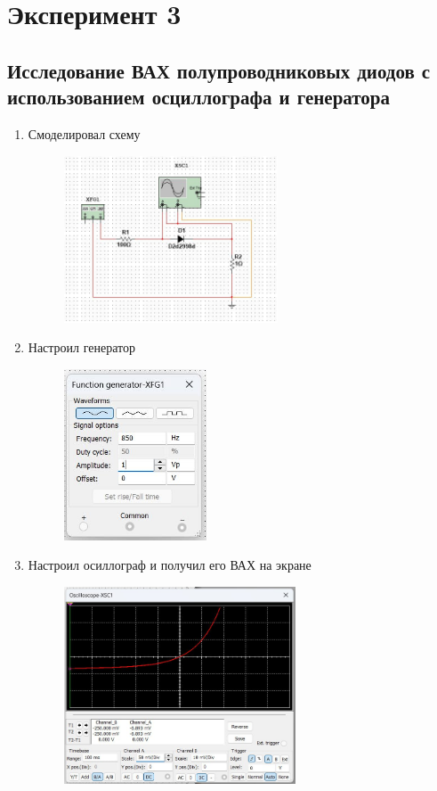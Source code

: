 \chapter{Эксперимент 3}

\section*{Исследование ВАХ полупроводниковых диодов с использованием осциллографа и генератора}

\begin{enumerate}
	\item Смоделировал схему
	\begin{figure}[H]
		\centering
		\includegraphics[width=0.6\textwidth]{img/15.jpg}
	\end{figure}
	\item Настроил генератор
	\begin{figure}[H]
		\centering
		\includegraphics[width=0.4\textwidth]{img/16.jpg}
	\end{figure}
	\newpage
	\item Настроил осиллограф и получил его ВАХ на экране
	\begin{figure}[H]
		\centering
		\includegraphics[width=0.65\textwidth]{img/17.jpg}

\end{figure}
\end{enumerate}
